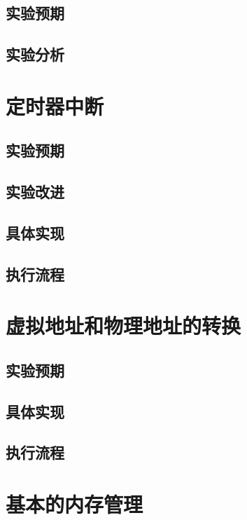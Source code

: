 \subsection{实验预期}

\subsection{实验分析}

\section{定时器中断}

\subsection{实验预期}

\subsection{实验改进}

\subsection{具体实现}

\subsection{执行流程}

\section{虚拟地址和物理地址的转换}

\subsection{实验预期}

\subsection{具体实现}

\subsection{执行流程}

\section{基本的内存管理}

